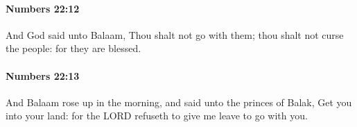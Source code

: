 		\paragraph{Numbers 22:12} %
			\label{NUMBERS-22-12}

			And God said unto Balaam, Thou shalt not go with them; thou shalt not curse the people: for they are blessed.


		\paragraph{Numbers 22:13} %
			\label{NUMBERS-22-13}

			And Balaam rose up in the morning, and said unto the princes of Balak, Get you into your land: for the LORD refuseth to give me leave to go with you.


